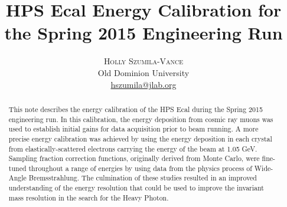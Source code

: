 \documentclass[twoside]{article}
\title{\vspace{-15mm}\fontsize{24pt}{10pt}\selectfont\textbf{HPS Ecal Energy Calibration for the Spring 2015 Engineering Run}} %
\author{
\large
\textsc{Holly Szumila-Vance}\\[2mm] %
\normalsize Old Dominion University\\ %
\normalsize \href{mailto:hszumila@jlab.org}{hszumila@jlab.org} %
\vspace{-5mm}
}
\date{}
\begin{document}
\maketitle %

\thispagestyle{fancy} %


\begin{abstract}

\noindent 
This note describes the energy calibration of the HPS Ecal during the Spring 2015 engineering run. In this calibration, the energy deposition from cosmic ray muons was used to establish initial gains for data acquisition prior to beam running. A more precise energy calibration was achieved by using the energy deposition in each crystal from elastically-scattered electrons carrying the energy of the beam at 1.05 GeV. Sampling fraction correction functions, originally derived from Monte Carlo, were fine-tuned throughout a range of energies by using data from the physics process of Wide-Angle Bremsstrahlung. The culmination of these studies resulted in an improved understanding of the energy resolution that could be used to improve the invariant mass resolution in the search for the Heavy Photon.  
\end{abstract}

\end{document}
